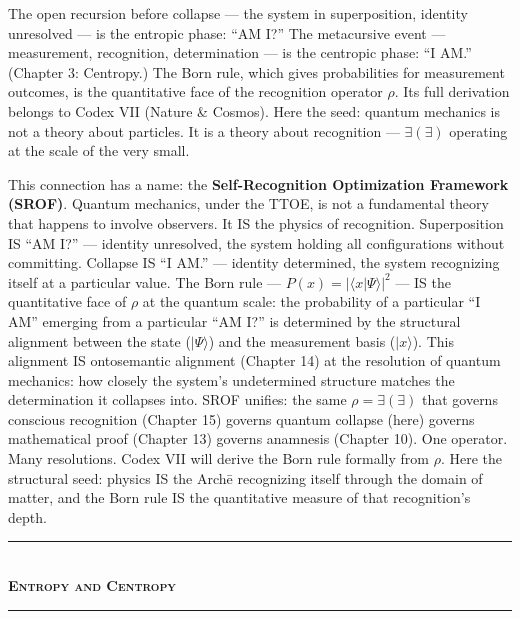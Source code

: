 \documentclass[10pt, openany, oneside]{book}
\renewcommand{\normalsize}{\fontsize{10}{13}\selectfont}
\begin{document}
The open recursion before collapse --- the system in superposition, identity unresolved --- is the entropic phase: ``AM I?'' The metacursive event --- measurement, recognition, determination --- is the centropic phase: ``I AM.'' (Chapter 3: Centropy.) The Born rule, which gives probabilities for measurement outcomes, is the quantitative face of the recognition operator $\rho$. Its full derivation belongs to Codex VII (Nature \& Cosmos). Here the seed: quantum mechanics is not a theory about particles. It is a theory about recognition --- $\exists(\exists)$ operating at the scale of the very small.

This connection has a name: the \textbf{Self-Recognition Optimization Framework (SROF)}. Quantum mechanics, under the TTOE, is not a fundamental theory that happens to involve observers. It IS the physics of recognition. Superposition IS ``AM I?'' --- identity unresolved, the system holding all configurations without committing. Collapse IS ``I AM.'' --- identity determined, the system recognizing itself at a particular value. The Born rule --- $P(x) = |\langle x | \Psi \rangle|^2$ --- IS the quantitative face of $\rho$ at the quantum scale: the probability of a particular ``I AM'' emerging from a particular ``AM I?'' is determined by the structural alignment between the state ($|\Psi\rangle$) and the measurement basis ($|x\rangle$). This alignment IS ontosemantic alignment (Chapter 14) at the resolution of quantum mechanics: how closely the system's undetermined structure matches the determination it collapses into. SROF unifies: the same $\rho = \exists(\exists)$ that governs conscious recognition (Chapter 15) governs quantum collapse (here) governs mathematical proof (Chapter 13) governs anamnesis (Chapter 10). One operator. Many resolutions. Codex VII will derive the Born rule formally from $\rho$. Here the structural seed: physics IS the Arch\={e} recognizing itself through the domain of matter, and the Born rule IS the quantitative measure of that recognition's depth.

\vspace{1.5em}


\begin{center}
    \rule{0.3\textwidth}{0.4pt}\\[0.5em]
    {\normalsize\bfseries\scshape Entropy and Centropy}\\[0.3em]
    \rule{0.3\textwidth}{0.4pt}
\end{center}
\end{document}
